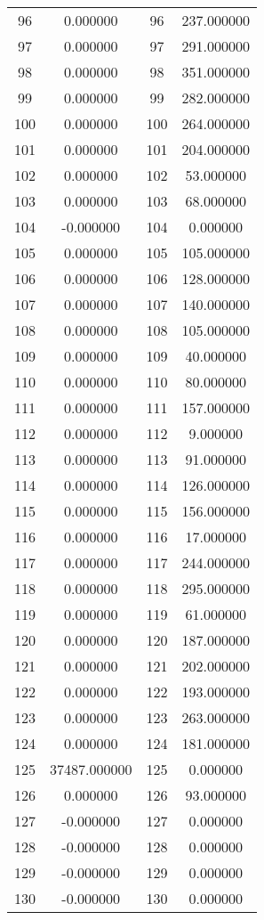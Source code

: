 \documentclass[12pt]{article}
\begin{document}
\begin{longtable}{@{}cccc@{}}
96 & 0.000000 & 96 & 237.000000 \\
97 & 0.000000 & 97 & 291.000000 \\
98 & 0.000000 & 98 & 351.000000 \\
99 & 0.000000 & 99 & 282.000000 \\
100 & 0.000000 & 100 & 264.000000 \\
101 & 0.000000 & 101 & 204.000000 \\
102 & 0.000000 & 102 & 53.000000 \\
103 & 0.000000 & 103 & 68.000000 \\
104 & -0.000000 & 104 & 0.000000 \\
105 & 0.000000 & 105 & 105.000000 \\
106 & 0.000000 & 106 & 128.000000 \\
107 & 0.000000 & 107 & 140.000000 \\
108 & 0.000000 & 108 & 105.000000 \\
109 & 0.000000 & 109 & 40.000000 \\
110 & 0.000000 & 110 & 80.000000 \\
111 & 0.000000 & 111 & 157.000000 \\
112 & 0.000000 & 112 & 9.000000 \\
113 & 0.000000 & 113 & 91.000000 \\
114 & 0.000000 & 114 & 126.000000 \\
115 & 0.000000 & 115 & 156.000000 \\
116 & 0.000000 & 116 & 17.000000 \\
117 & 0.000000 & 117 & 244.000000 \\
118 & 0.000000 & 118 & 295.000000 \\
119 & 0.000000 & 119 & 61.000000 \\
120 & 0.000000 & 120 & 187.000000 \\
121 & 0.000000 & 121 & 202.000000 \\
122 & 0.000000 & 122 & 193.000000 \\
123 & 0.000000 & 123 & 263.000000 \\
124 & 0.000000 & 124 & 181.000000 \\
125 & 37487.000000 & 125 & 0.000000 \\
126 & 0.000000 & 126 & 93.000000 \\
127 & -0.000000 & 127 & 0.000000 \\
128 & -0.000000 & 128 & 0.000000 \\
129 & -0.000000 & 129 & 0.000000 \\
130 & -0.000000 & 130 & 0.000000 \\

\end{longtable}
\end{document}
